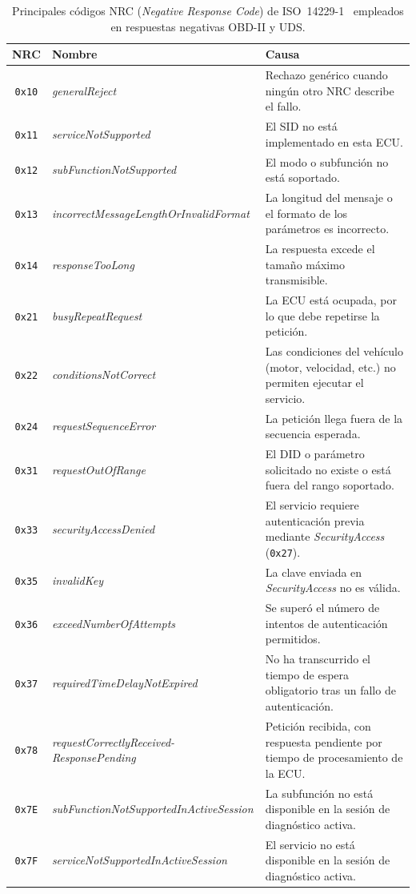 \begin{table}[!htbp]
\caption{Principales códigos NRC (\textit{Negative Response Code}) de ISO~14229-1~\cite{ISO14229-1:2020} empleados en respuestas negativas OBD-II y UDS.}
\label{tab:uds_nrc}
\centering
\renewcommand{\arraystretch}{0.95}
\begin{tabular}{|c|l|p{9cm}|}
\hline
\textbf{NRC} & \textbf{Nombre} & \textbf{Causa} \\
\hline
\texttt{0x10} & \textit{generalReject}            & Rechazo genérico cuando ningún otro NRC describe el fallo. \\
\hline
\texttt{0x11} & \textit{serviceNotSupported}     & El SID no está implementado en esta ECU. \\
\hline
\texttt{0x12} & \textit{subFunctionNotSupported} & El modo o subfunción no está soportado. \\
\hline
\texttt{0x13} & \textit{incorrectMessageLengthOrInvalidFormat} & La longitud del mensaje o el formato de los parámetros es incorrecto. \\
\hline
\texttt{0x14} & \textit{responseTooLong}         & La respuesta excede el tamaño máximo transmisible. \\
\hline
\texttt{0x21} & \textit{busyRepeatRequest}       & La ECU está ocupada, por lo que debe repetirse la petición. \\
\hline
\texttt{0x22} & \textit{conditionsNotCorrect}    & Las condiciones del vehículo (motor, velocidad, etc.) no permiten ejecutar el servicio. \\
\hline
\texttt{0x24} & \textit{requestSequenceError}    & La petición llega fuera de la secuencia esperada. \\
\hline
\texttt{0x31} & \textit{requestOutOfRange}       & El DID o parámetro solicitado no existe o está fuera del rango soportado. \\
\hline
\texttt{0x33} & \textit{securityAccessDenied}    & El servicio requiere autenticación previa mediante \textit{SecurityAccess} (\texttt{0x27}). \\
\hline
\texttt{0x35} & \textit{invalidKey}              & La clave enviada en \textit{SecurityAccess} no es válida. \\
\hline
\texttt{0x36} & \textit{exceedNumberOfAttempts}  & Se superó el número de intentos de autenticación permitidos. \\
\hline
\texttt{0x37} & \textit{requiredTimeDelayNotExpired} & No ha transcurrido el tiempo de espera obligatorio tras un fallo de autenticación. \\
\hline
\texttt{0x78} & \textit{requestCorrectlyReceived-ResponsePending} & Petición recibida, con respuesta pendiente por tiempo de procesamiento de la ECU. \\
\hline
\texttt{0x7E} & \textit{subFunctionNotSupportedInActiveSession} & La subfunción no está disponible en la sesión de diagnóstico activa. \\
\hline
\texttt{0x7F} & \textit{serviceNotSupportedInActiveSession} & El servicio no está disponible en la sesión de diagnóstico activa. \\
\hline
\end{tabular}
\end{table}
